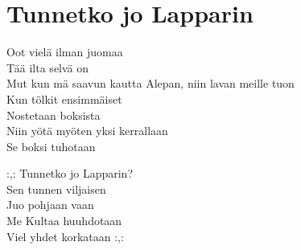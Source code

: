 \section{Tunnetko jo Lapparin}

Oot vielä ilman juomaa\\
Tää ilta selvä on \\
Mut kun mä saavun kautta Alepan, niin lavan meille tuon \\
Kun tölkit ensimmäiset \\
Nostetaan boksista \\
Niin yötä myöten yksi kerrallaan \\
Se boksi tuhotaan 

:,: Tunnetko jo Lapparin? \\
Sen tunnen viljaisen \\
Juo pohjaan vaan \\
Me Kultaa huuhdotaan  \\
Viel yhdet korkataan :,: